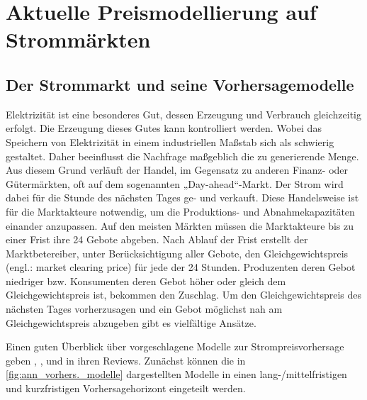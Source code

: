 

\section{Aktuelle Preismodellierung auf Strommärkten}\label{sec:strompreis}


\subsection{Der Strommarkt und seine Vorhersagemodelle}

Elektrizität ist eine besonderes Gut, dessen Erzeugung und Verbrauch gleichzeitig erfolgt. Die Erzeugung dieses Gutes kann kontrolliert werden. Wobei das Speichern von Elektrizität in einem industriellen Maßstab sich als schwierig gestaltet. Daher beeinflusst die Nachfrage maßgeblich die zu generierende Menge. Aus diesem Grund verläuft der Handel, im Gegensatz zu anderen Finanz- oder Gütermärkten, oft auf dem sogenannten „Day-ahead“-Markt. Der Strom wird dabei für die Stunde des nächsten Tages ge- und verkauft. Diese Handelsweise ist für die Marktakteure notwendig, um die Produktions- und Abnahmekapazitäten einander anzupassen. Auf den meisten Märkten müssen die Marktakteure bis zu einer Frist ihre 24 Gebote abgeben. Nach Ablauf der Frist erstellt der Marktbetereiber, unter Berücksichtigung aller Gebote, den Gleichgewichtspreis (engl.: market clearing price) für jede der 24 Stunden. Produzenten deren Gebot niedriger bzw. Konsumenten deren Gebot höher oder gleich dem Gleichgewichtspreis ist, bekommen den Zuschlag. Um den Gleichgewichtspreis des nächsten Tages vorherzusagen und ein Gebot möglichst nah am Gleichgewichtspreis abzugeben gibt es vielfältige Ansätze.

Einen guten Überblick über vorgeschlagene Modelle zur Strompreisvorhersage geben \citet{Aggarwal2009}, \citet{Cerjan2013}, \citet{Weron2014} und \citet{Panapakidis2016} in ihren Reviews. Zunächst können die in \autoref{fig:ann_vorhers._modelle} dargestellten Modelle in einen lang-/mittelfristigen und kurzfristigen Vorhersagehorizont eingeteilt werden. 

